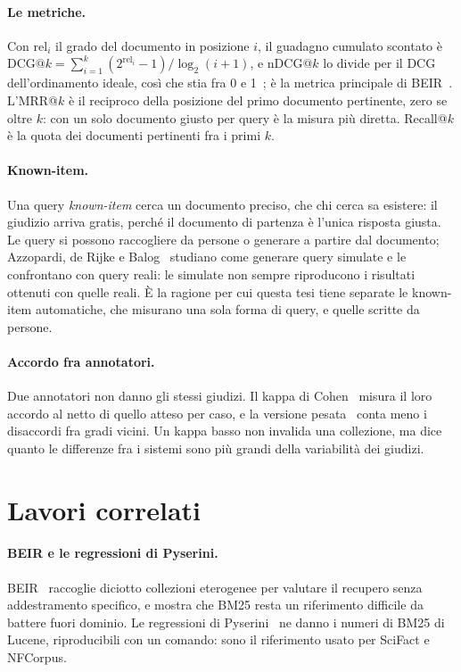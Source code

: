 \paragraph{Le metriche.} Con $\text{rel}_i$ il grado del documento in posizione
$i$, il guadagno cumulato scontato è
$\text{DCG@}k = \sum_{i=1}^{k} (2^{\text{rel}_i} - 1)/\log_2(i + 1)$, e nDCG@$k$
lo divide per il DCG dell'ordinamento ideale, così che stia fra 0 e
1~\cite{jarvelin2002ndcg}; è la metrica principale di BEIR~\cite{thakur2021beir}.
L'MRR@$k$ è il reciproco della posizione del primo documento pertinente, zero se
oltre $k$: con un solo documento giusto per query è la misura più diretta.
Recall@$k$ è la quota dei documenti pertinenti fra i primi $k$.

\paragraph{Known-item.} Una query \emph{known-item} cerca un documento preciso,
che chi cerca sa esistere: il giudizio arriva gratis, perché il documento di
partenza è l'unica risposta giusta. Le query si possono raccogliere da persone o
generare a partire dal documento; Azzopardi, de Rijke e
Balog~\cite{azzopardi2007known} studiano come generare query simulate e le confrontano con
query reali: le simulate non sempre riproducono i risultati ottenuti con quelle
reali. È la ragione per cui questa
tesi tiene separate le known-item automatiche, che misurano una sola forma di
query, e quelle scritte da persone.

\paragraph{Accordo fra annotatori.} Due annotatori non danno gli stessi giudizi.
Il kappa di Cohen~\cite{cohen1960kappa} misura il loro accordo al netto di quello
atteso per caso, e la versione pesata~\cite{cohen1968weighted} conta meno i
disaccordi fra gradi vicini. Un kappa basso non invalida una collezione, ma dice
quanto le differenze fra i sistemi sono più grandi della variabilità dei giudizi.

\section{Lavori correlati}\label{sec:correlati}

\paragraph{BEIR e le regressioni di Pyserini.} BEIR~\cite{thakur2021beir} raccoglie
diciotto collezioni eterogenee per valutare il recupero senza addestramento
specifico, e mostra che BM25 resta un riferimento difficile da battere fuori
dominio. Le regressioni di Pyserini~\cite{pyserini2cr} ne danno i numeri di BM25
di Lucene, riproducibili con un comando: sono il riferimento usato per SciFact e
NFCorpus.

